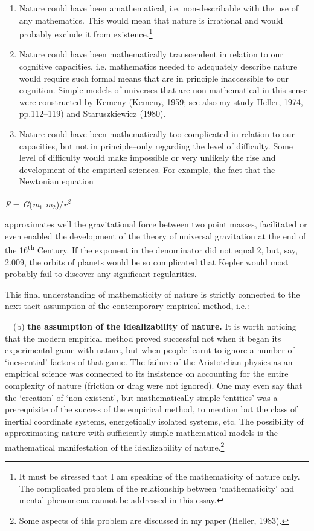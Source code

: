\documentclass[a4paper]{article}
\providecommand\textsubscript[1]{\ensuremath{{}_{\text{#1}}}}
\begin{document}
\begin{enumerate}
\item Nature could have been amathematical, i.e. non-describable with the use of any mathematics. This would mean that
nature is irrational and would probably exclude it from existence.\footnote{It must be stressed that I am speaking of
the mathematicity of nature only. The complicated problem of the relationship between ‘mathematicity’ and mental
phenomena cannot be addressed in this essay.}
\item Nature could have been mathematically transcendent in relation to our cognitive capacities, i.e. mathematics
needed to adequately describe nature would require such formal means that are in principle inaccessible to our
cognition. Simple models of universes that are non-mathematical in this sense were constructed by Kemeny
\label{ref:RNDyqLz7y4oHx}(Kemeny, 1959; see also my study Heller, 1974, pp.112–119) and Staruszkiewicz
\label{ref:RNDVbbltpjBRC}(1980).
\item Nature could have been mathematically too complicated in relation to our capacities, but not in principle–only
regarding the level of difficulty. Some level of difficulty would make impossible or very unlikely the rise and
development of the empirical sciences. For example, the fact that the Newtonian equation
\end{enumerate}
{\centering
\textit{F} = \textit{G}(\textit{m}\textit{\textsubscript{1}}
\textit{m}\textit{\textsubscript{2}})/\textit{r}\textit{\textsuperscript{2}}
\par}

approximates well the gravitational force between two point masses, facilitated or even enabled the development of the
theory of universal gravitation at the end of the 16\textsuperscript{th} Century. If the exponent in the denominator
did not equal 2, but, say, 2.009, the orbits of planets would be so complicated that Kepler would most probably fail to
discover any significant regularities.

This final understanding of mathematicity of nature is strictly connected to the next tacit assumption of the
contemporary empirical method, i.e.:

\ \ (b) \textbf{the assumption of the idealizability of nature.} It is worth noticing that the modern empirical method
proved successful not when it began its experimental game with nature, but when people learnt to ignore a number of
‘inessential’ factors of that game. The failure of the Aristotelian physics as an empirical science was connected to
its insistence on accounting for the entire complexity of nature (friction or drag were not ignored). One may even say
that the ‘creation’ of ‘non-existent’, but mathematically simple ‘entities’ was a prerequisite of the success of the
empirical method, to mention but the class of inertial coordinate systems, energetically isolated systems, etc. The
possibility of approximating nature with sufficiently simple mathematical models is the mathematical manifestation of
the idealizability of nature.\footnote{Some aspects of this problem are discussed in my paper
\label{ref:RNDAMyUgwcR21}(Heller, 1983).}
\end{document}
